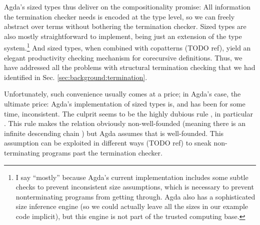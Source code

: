 Agda's sized types thus deliver on the compositionality promise: All information
the termination checker needs is encoded at the type level, so we can freely
abstract over terms without bothering the termination checker. Sized types are
also mostly straightforward to implement, being just an extension of the type
system.\footnote{I say \enquote{mostly} because Agda's current implementation
  includes some subtle checks to prevent inconsistent size assumptions, which is
  necessary to prevent nonterminating programs from getting through. Agda also
  has a sophisticated size inference engine (so we could actually leave all the
  sizes in our example code implicit), but this engine is not part of the
  trusted computing base.} And sized types, when combined with copatterns (TODO
ref), yield an elegant productivity checking mechanism for corecursive
definitions. Thus, we have addressed all the problems with structural
termination checking that we had identified in Sec.
\ref{sec:background:termination}.

Unfortunately, such convenience usually comes at a price; in Agda's case, the
ultimate price: Agda's implementation of sized types is, and has been for some
time, inconsistent. The culprit seems to be the highly dubious rule , in particular . This rule makes the \icode{<} relation
obviously non-well-founded (meaning there is an infinite descending chain
) but Agda assumes that \icode{<} is well-founded. This
assumption can be exploited in different ways (TODO ref) to sneak
non-terminating programs past the termination checker.
